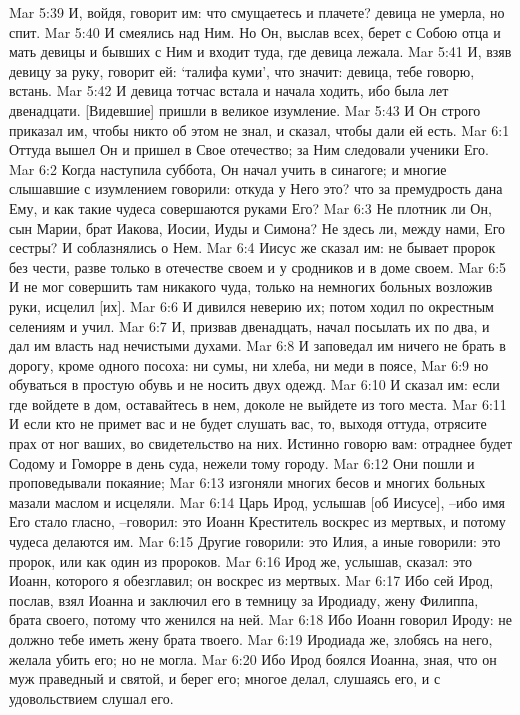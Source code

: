Mar 5:39  И, войдя, говорит им: что смущаетесь и плачете? девица не умерла, но спит.
Mar 5:40  И смеялись над Ним. Но Он, выслав всех, берет с Собою отца и мать девицы и бывших с Ним и входит туда, где девица лежала.
Mar 5:41  И, взяв девицу за руку, говорит ей: `талифа куми', что значит: девица, тебе говорю, встань.
Mar 5:42  И девица тотчас встала и начала ходить, ибо была лет двенадцати. [Видевшие] пришли в великое изумление.
Mar 5:43  И Он строго приказал им, чтобы никто об этом не знал, и сказал, чтобы дали ей есть.
Mar 6:1  Оттуда вышел Он и пришел в Свое отечество; за Ним следовали ученики Его.
Mar 6:2  Когда наступила суббота, Он начал учить в синагоге; и многие слышавшие с изумлением говорили: откуда у Него это? что за премудрость дана Ему, и как такие чудеса совершаются руками Его?
Mar 6:3  Не плотник ли Он, сын Марии, брат Иакова, Иосии, Иуды и Симона? Не здесь ли, между нами, Его сестры? И соблазнялись о Нем.
Mar 6:4  Иисус же сказал им: не бывает пророк без чести, разве только в отечестве своем и у сродников и в доме своем.
Mar 6:5  И не мог совершить там никакого чуда, только на немногих больных возложив руки, исцелил [их].
Mar 6:6  И дивился неверию их; потом ходил по окрестным селениям и учил.
Mar 6:7  И, призвав двенадцать, начал посылать их по два, и дал им власть над нечистыми духами.
Mar 6:8  И заповедал им ничего не брать в дорогу, кроме одного посоха: ни сумы, ни хлеба, ни меди в поясе,
Mar 6:9  но обуваться в простую обувь и не носить двух одежд.
Mar 6:10  И сказал им: если где войдете в дом, оставайтесь в нем, доколе не выйдете из того места.
Mar 6:11  И если кто не примет вас и не будет слушать вас, то, выходя оттуда, отрясите прах от ног ваших, во свидетельство на них. Истинно говорю вам: отраднее будет Содому и Гоморре в день суда, нежели тому городу.
Mar 6:12  Они пошли и проповедывали покаяние;
Mar 6:13  изгоняли многих бесов и многих больных мазали маслом и исцеляли.
Mar 6:14  Царь Ирод, услышав [об Иисусе], --ибо имя Его стало гласно, --говорил: это Иоанн Креститель воскрес из мертвых, и потому чудеса делаются им.
Mar 6:15  Другие говорили: это Илия, а иные говорили: это пророк, или как один из пророков.
Mar 6:16  Ирод же, услышав, сказал: это Иоанн, которого я обезглавил; он воскрес из мертвых.
Mar 6:17  Ибо сей Ирод, послав, взял Иоанна и заключил его в темницу за Иродиаду, жену Филиппа, брата своего, потому что женился на ней.
Mar 6:18  Ибо Иоанн говорил Ироду: не должно тебе иметь жену брата твоего.
Mar 6:19  Иродиада же, злобясь на него, желала убить его; но не могла.
Mar 6:20  Ибо Ирод боялся Иоанна, зная, что он муж праведный и святой, и берег его; многое делал, слушаясь его, и с удовольствием слушал его.
